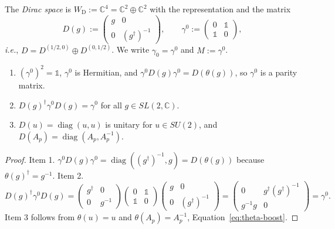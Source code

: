 	\begin{definition}\label{def:dirac-space}
		The \emph{Dirac space} is $W_{\mathrm{D}}:=\mathbb{C}^4=\mathbb{C}^2\oplus\mathbb{C}^2$ with the representation and the matrix
		\begin{equation*}
			D(g):=\begin{pmatrix}g&0\\0&(g^\dagger)^{-1}\end{pmatrix},\qquad \gamma^0:=\begin{pmatrix}0&\mathbb{1}\\\mathbb{1}&0\end{pmatrix},
		\end{equation*}
		\textit{i.e.}, $D=D^{(1/2,0)}\oplus D^{(0,1/2)}$. We write $\gamma_0=\gamma^0$ and $M:=\gamma^0$.
	\end{definition}
	
	\begin{lemma}\label{lem:dirac-space}
		\begin{enumerate}
			\item $(\gamma^0)^2=\mathbb{1}$, $\gamma^0$ is Hermitian, and $\gamma^0D(g)\gamma^0=D(\theta(g))$, so $\gamma^0$ is a parity matrix.
			\item $D(g)^\dagger\gamma^0D(g)=\gamma^0$ for all $g\in SL(2,\mathbb{C})$.
			\item $D(u)=\operatorname{diag}(u,u)$ is unitary for $u\in SU(2)$, and $D(A_p)=\operatorname{diag}(A_p,A_p^{-1})$.
		\end{enumerate}
	\end{lemma}
	
	\begin{proof}
		Item 1. $\gamma^0D(g)\gamma^0=\operatorname{diag}((g^\dagger)^{-1},g)=D(\theta(g))$ because $\theta(g)^\dagger=g^{-1}$. Item 2.
		\begin{equation*}
			D(g)^\dagger\gamma^0D(g)=\begin{pmatrix}g^\dagger&0\\0&g^{-1}\end{pmatrix}\begin{pmatrix}0&\mathbb{1}\\\mathbb{1}&0\end{pmatrix}\begin{pmatrix}g&0\\0&(g^\dagger)^{-1}\end{pmatrix}=\begin{pmatrix}0&g^\dagger(g^\dagger)^{-1}\\g^{-1}g&0\end{pmatrix}=\gamma^0.
		\end{equation*}
		Item 3 follows from $\theta(u)=u$ and $\theta(A_p)=A_p^{-1}$, Equation~\eqref{eq:theta-boost}.
	\end{proof}
	
